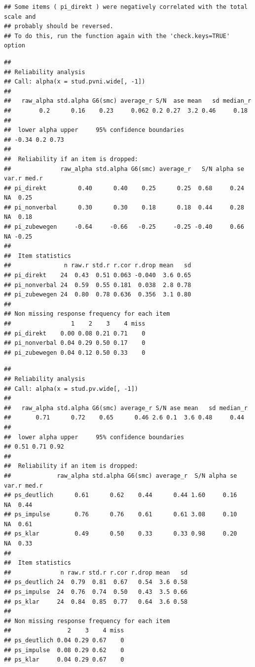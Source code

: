 \documentclass[
  english,
  man,floatsintext]{apa6}
\begin{document}
\begin{verbatim}
## Some items ( pi_direkt ) were negatively correlated with the total scale and 
## probably should be reversed.  
## To do this, run the function again with the 'check.keys=TRUE' option
\end{verbatim}

\begin{verbatim}
## 
## Reliability analysis   
## Call: alpha(x = stud.pvni.wide[, -1])
## 
##   raw_alpha std.alpha G6(smc) average_r S/N  ase mean   sd median_r
##        0.2      0.16    0.23     0.062 0.2 0.27  3.2 0.46     0.18
## 
##  lower alpha upper     95% confidence boundaries
## -0.34 0.2 0.73 
## 
##  Reliability if an item is dropped:
##              raw_alpha std.alpha G6(smc) average_r   S/N alpha se var.r med.r
## pi_direkt         0.40      0.40    0.25      0.25  0.68     0.24    NA  0.25
## pi_nonverbal      0.30      0.30    0.18      0.18  0.44     0.28    NA  0.18
## pi_zubewegen     -0.64     -0.66   -0.25     -0.25 -0.40     0.66    NA -0.25
## 
##  Item statistics 
##               n raw.r std.r r.cor r.drop mean   sd
## pi_direkt    24  0.43  0.51 0.063 -0.040  3.6 0.65
## pi_nonverbal 24  0.59  0.55 0.181  0.038  2.8 0.78
## pi_zubewegen 24  0.80  0.78 0.636  0.356  3.1 0.80
## 
## Non missing response frequency for each item
##                 1    2    3    4 miss
## pi_direkt    0.00 0.08 0.21 0.71    0
## pi_nonverbal 0.04 0.29 0.50 0.17    0
## pi_zubewegen 0.04 0.12 0.50 0.33    0
\end{verbatim}

\begin{verbatim}
## 
## Reliability analysis   
## Call: alpha(x = stud.pv.wide[, -1])
## 
##   raw_alpha std.alpha G6(smc) average_r S/N ase mean   sd median_r
##       0.71      0.72    0.65      0.46 2.6 0.1  3.6 0.48     0.44
## 
##  lower alpha upper     95% confidence boundaries
## 0.51 0.71 0.92 
## 
##  Reliability if an item is dropped:
##             raw_alpha std.alpha G6(smc) average_r  S/N alpha se var.r med.r
## ps_deutlich      0.61      0.62    0.44      0.44 1.60     0.16    NA  0.44
## ps_impulse       0.76      0.76    0.61      0.61 3.08     0.10    NA  0.61
## ps_klar          0.49      0.50    0.33      0.33 0.98     0.20    NA  0.33
## 
##  Item statistics 
##              n raw.r std.r r.cor r.drop mean   sd
## ps_deutlich 24  0.79  0.81  0.67   0.54  3.6 0.58
## ps_impulse  24  0.76  0.74  0.50   0.43  3.5 0.66
## ps_klar     24  0.84  0.85  0.77   0.64  3.6 0.58
## 
## Non missing response frequency for each item
##                2    3    4 miss
## ps_deutlich 0.04 0.29 0.67    0
## ps_impulse  0.08 0.29 0.62    0
## ps_klar     0.04 0.29 0.67    0
\end{verbatim}
\end{document}
